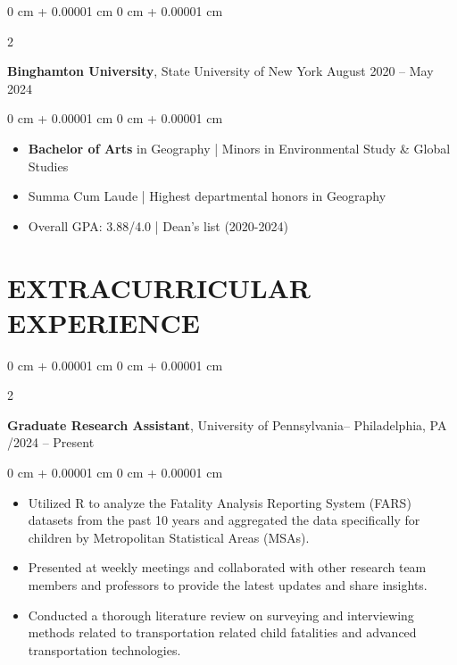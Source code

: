 \documentclass[10pt, letterpaper]{article}
\newenvironment{highlights}{
    \begin{itemize}[
        topsep=0.10 cm,
        parsep=0.10 cm,
        partopsep=0pt,
        itemsep=0pt,
        leftmargin=0 cm + 10pt
    ]
}{
    \end{itemize}
} %
\newenvironment{onecolentry}{
    \begin{adjustwidth}{
        0 cm + 0.00001 cm
    }{
        0 cm + 0.00001 cm
    }
}{
    \end{adjustwidth}
} %
\newenvironment{twocolentry}[2][]{
    \onecolentry
    \def\secondColumn{#2}
    \setcolumnwidth{\fill, 4.5 cm}
    \begin{paracol}{2}
}{
    \switchcolumn \raggedleft \secondColumn
    \end{paracol}
    \endonecolentry
} %
\begin{document}
        \begin{twocolentry}{
            August 2020 – May 2024
        }
            \textbf{Binghamton University}, State University of New York\end{twocolentry}

        \vspace{0.10 cm}
        \begin{onecolentry}
            \begin{highlights}
                \item \textbf{Bachelor of Arts} in Geography | Minors in Environmental Study \& Global Studies
                \item  Summa Cum Laude | Highest departmental honors in Geography
                \item  Overall GPA: 3.88/4.0 | Dean’s list (2020-2024)
            \end{highlights}
        \end{onecolentry}



    \section{\textbf{EXTRACURRICULAR EXPERIENCE }
}




        \begin{twocolentry}{
            10/2024 – Present
        }
\textbf{Graduate Research Assistant}, University of Pennsylvania-- Philadelphia, PA\end{twocolentry}

        \vspace{0.10 cm}
        \begin{onecolentry}
            \begin{highlights}
                \item Utilized R to analyze the Fatality Analysis Reporting System (FARS) datasets from the past 10 years and aggregated the data specifically for children by Metropolitan Statistical Areas (MSAs).
                \item Presented at weekly meetings and collaborated with other research team members and professors to provide the latest updates and share insights.
                \item Conducted a thorough literature review on surveying and interviewing methods related to transportation related child fatalities and advanced transportation technologies.
            \end{highlights}
        \end{onecolentry}
\end{document}
